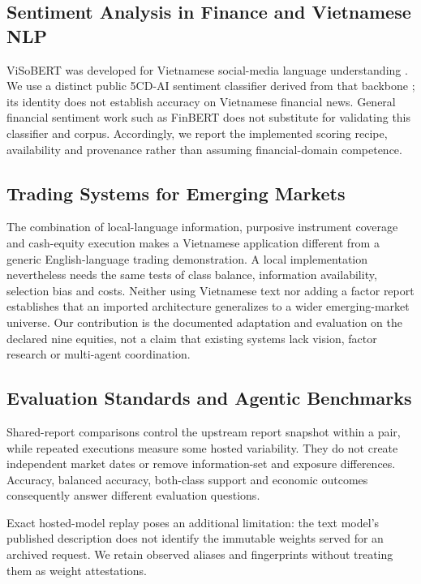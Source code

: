 \subsection{Sentiment Analysis in Finance and Vietnamese NLP}
ViSoBERT was developed for Vietnamese social-media language understanding \cite{nguyen2023visobert}. We use a distinct public 5CD-AI sentiment classifier derived from that backbone \cite{hf5cdsentiment}; its identity does not establish accuracy on Vietnamese financial news. General financial sentiment work such as FinBERT \cite{araci2019finbert} does not substitute for validating this classifier and corpus. Accordingly, we report the implemented scoring recipe, availability and provenance rather than assuming financial-domain competence. \subsection{Trading Systems for Emerging Markets}
The combination of local-language information, purposive instrument coverage and cash-equity execution makes a Vietnamese application different from a generic English-language trading demonstration. A local implementation nevertheless needs the same tests of class balance, information availability, selection bias and costs. Neither using Vietnamese text nor adding a factor report establishes that an imported architecture generalizes to a wider emerging-market universe. Our contribution is the documented adaptation and evaluation on the declared nine equities, not a claim that existing systems lack vision, factor research or multi-agent coordination.

\subsection{Evaluation Standards and Agentic Benchmarks}
Shared-report comparisons control the upstream report snapshot within a pair, while repeated executions measure some hosted variability. They do not create independent market dates or remove information-set and exposure differences. Accuracy, balanced accuracy, both-class support and economic outcomes consequently answer different evaluation questions.

Exact hosted-model replay poses an additional limitation: the text model's published description \cite{openai2025gptoss} does not identify the immutable weights served for an archived request. We retain observed aliases and fingerprints without treating them as weight attestations.
